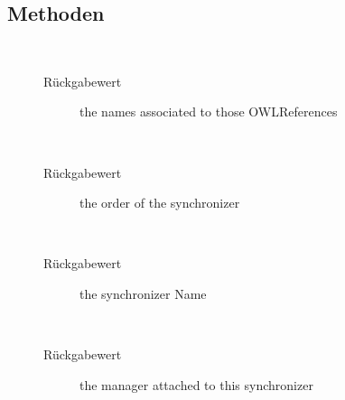 \subsection{Methoden}
\begin{description}
\item[{\label{ontologyFramework.OFContextManagement.synchronisingManager.OFSerializeSynchroniserData.getOntoNames()}}]
~ 
\begin{description}
\item[Rückgabewert] 
the names associated to those OWLReferences
\end{description}
\item[{\label{ontologyFramework.OFContextManagement.synchronisingManager.OFSerializeSynchroniserData.getSize()}}]
~ 
\begin{description}
\item[Rückgabewert] 
the order of the synchronizer
\end{description}
\item[{\label{ontologyFramework.OFContextManagement.synchronisingManager.OFSerializeSynchroniserData.getSyName()}}]
~ 
\begin{description}
\item[Rückgabewert] 
the synchronizer Name
\end{description}
\item[{\label{ontologyFramework.OFContextManagement.synchronisingManager.OFSerializeSynchroniserData.getManager()}}]
~ 
\begin{description}
\item[Rückgabewert] 
the manager attached to this synchronizer
\end{description}
\end{description}
